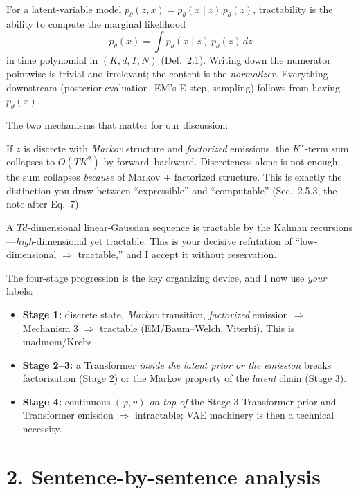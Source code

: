 \documentclass[11pt]{article}
\begin{document}
For a latent-variable model $p_\theta(z,x)=p_\theta(x\mid z)\,p_\theta(z)$, tractability is the
ability to compute the marginal likelihood
\[
  p_\theta(x)=\int p_\theta(x\mid z)\,p_\theta(z)\,dz
\]
in time polynomial in $(K,d,T,N)$ (Def.~2.1). Writing down the numerator pointwise is trivial and
irrelevant; the content is the \emph{normalizer}. Everything downstream (posterior evaluation,
EM's E-step, sampling) follows from having $p_\theta(x)$.

The two mechanisms that matter for our discussion:
\begin{description}[leftmargin=1.4em]
\item[Mechanism 3 (Sec.~2.5.3).] If $z$ is discrete with \emph{Markov} structure and \emph{factorized}
emissions, the $K^{T}$-term sum collapses to $O(TK^2)$ by forward--backward. Discreteness alone is
not enough; the sum collapses \emph{because} of Markov $+$ factorized structure. This is exactly the
distinction you draw between ``expressible'' and ``computable'' (Sec.~2.5.3, the note after Eq.~7).
\item[Mechanism 4 (Sec.~2.5.4).] A $Td$-dimensional linear-Gaussian sequence is tractable by the
Kalman recursions---\emph{high}-dimensional yet tractable. This is your decisive refutation of
``low-dimensional $\Rightarrow$ tractable,'' and I accept it without reservation.
\end{description}

The four-stage progression is the key organizing device, and I now use \emph{your} labels:
\begin{itemize}[leftmargin=1.4em]
\item \textbf{Stage 1:} discrete state, \emph{Markov} transition, \emph{factorized} emission
$\Rightarrow$ Mechanism 3 $\Rightarrow$ tractable (EM/Baum--Welch, Viterbi). This is madmom/Krebs.
\item \textbf{Stage 2--3:} a Transformer \emph{inside the latent prior or the emission} breaks
factorization (Stage 2) or the Markov property of the \emph{latent} chain (Stage 3).
\item \textbf{Stage 4:} continuous $(\varphi,v)$ \emph{on top of} the Stage-3 Transformer prior and
Transformer emission $\Rightarrow$ intractable; VAE machinery is then a technical necessity.
\end{itemize}

\section*{2. Sentence-by-sentence analysis}
\end{document}
